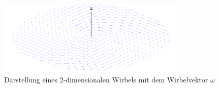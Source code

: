 \begin{figure}
\centering
\includegraphics[width=0.8\textwidth]{papers/wirbelringe/fig/flacher_wirbel.pdf}
\caption{Darstellung eines 2-dimensionalen Wirbels mit dem Wirbelvektor \(\omega\) \label{Wirbelringe:fig:flacher_wirbel}}
\end{figure}